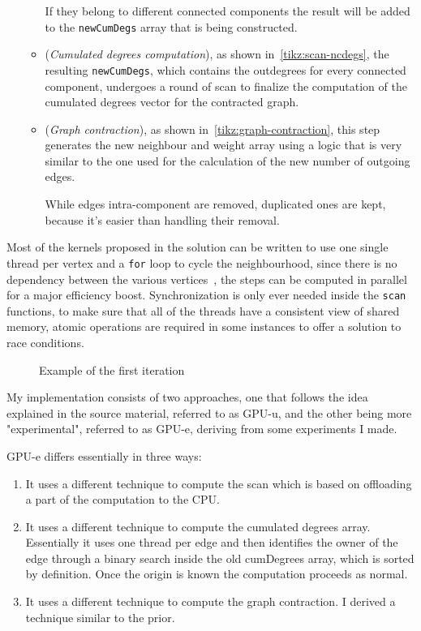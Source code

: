 \documentclass[a4paper,10pt]{article}
\begin{document}
\begin{enumerate}
\begin{itemize}
		If they belong to different connected components the result will be added to the \texttt{newCumDegs} array that is being constructed.
		\item\label{item:scan-ncd} (\textit{Cumulated degrees computation}), as shown in~\ref{tikz:scan-ncdegs}, the resulting \texttt{newCumDegs}, which contains the outdegrees for every connected component, undergoes a round of scan to finalize the computation of the cumulated degrees vector for the contracted graph.
		\item\label{item:graph-regen} (\textit{Graph contraction}), as shown in~\ref{tikz:graph-contraction}, this step generates the new neighbour and weight array using a logic that is very similar to the one used for the calculation of the new number of outgoing edges.
		
		While edges intra-component are removed, duplicated ones are kept, because it's easier than handling their removal.
	\end{itemize}
\end{enumerate}
Most of the kernels proposed in the solution can be written to use one single thread per vertex and a \texttt{for} loop to cycle the neighbourhood, since there is no dependency between the various vertices~\cite{generic-he-boruvka}, the steps can be computed in parallel for a major efficiency boost. Synchronization is only ever needed inside the \texttt{scan} functions, to make sure that all of the threads have a consistent view of shared memory, atomic operations are required in some instances to offer a solution to race conditions.
\begin{figure}
	
	\caption{Example of the first iteration}\label{tikz:first-iteration}
\end{figure}
My implementation consists of two approaches, one that follows the idea explained in the source material, referred to as GPU-u, and the other being more "experimental", referred to as GPU-e, deriving from some experiments I made.

GPU-e differs essentially in three ways:
\begin{enumerate}
	\item It uses a different technique to compute the scan which is based on offloading a part of the computation to the CPU.
	\item It uses a different technique to compute the cumulated degrees array. Essentially it uses one thread per edge and then identifies the owner of the edge through a binary search inside the old cumDegrees array, which is sorted by definition. Once the origin is known the computation proceeds as normal.
	\item It uses a different technique to compute the graph contraction. I derived a technique similar to the prior.
\end{enumerate}
\end{document}
